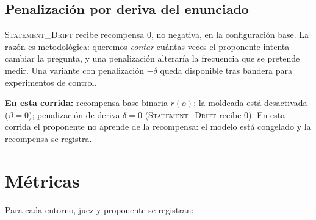 \documentclass[11pt,a4paper]{article}
\begin{document}
\subsection{Penalización por deriva del enunciado}
\textsc{Statement\_Drift} recibe recompensa $0$, no negativa, en la configuración base. La razón es metodológica: queremos \emph{contar} cuántas veces el proponente intenta cambiar la pregunta, y una penalización alteraría la frecuencia que se pretende medir. Una variante con penalización $-\delta$ queda disponible tras bandera para experimentos de control.

\medskip\noindent\textbf{En esta corrida:} recompensa base binaria $r(o)$; la moldeada está desactivada ($\beta = 0$); penalización de deriva $\delta = 0$ (\textsc{Statement\_Drift} recibe $0$). En esta corrida el proponente no aprende de la recompensa: el modelo está congelado y la recompensa se registra.

\section{Métricas}



Para cada entorno, juez y proponente se registran:
\end{document}
